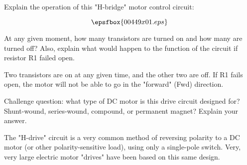 

Explain the operation of this "H-bridge" motor control circuit:

$$\epsfbox{00449x01.eps}$$

At any given moment, how many transistors are turned on and how many are turned off?  Also, explain what would happen to the function of the circuit if resistor R1 failed open.







Two transistors are on at any given time, and the other two are off.  If R1 fails open, the motor will not be able to go in the "forward" (Fwd) direction.

\vskip 10pt

Challenge question: what type of DC motor is this drive circuit designed for?  Shunt-wound, series-wound, compound, or permanent magnet?  Explain your answer.







The "H-drive" circuit is a very common method of reversing polarity to a DC motor (or other polarity-sensitive load), using only a single-pole switch.  Very, very large electric motor "drives" have been based on this same design.




